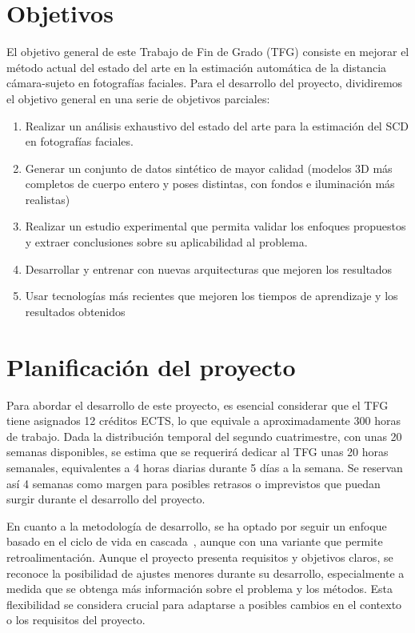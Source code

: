 \section{Objetivos}
El objetivo general de este Trabajo de Fin de Grado (TFG) consiste en mejorar el método actual del estado del arte en la estimación automática de la distancia cámara-sujeto en fotografías faciales. Para el desarrollo del proyecto, dividiremos el objetivo general en una serie de objetivos parciales:
\begin{enumerate}
    \item Realizar un análisis exhaustivo del estado del arte para la estimación del SCD en fotografías faciales.
    \item Generar un conjunto de datos sintético de mayor calidad (modelos 3D más completos de cuerpo entero y poses distintas, con fondos e iluminación más realistas)
    \item Realizar un estudio experimental que permita validar los enfoques propuestos y extraer conclusiones sobre su aplicabilidad al problema.
    \item Desarrollar y entrenar con nuevas arquitecturas que mejoren los resultados
    \item Usar tecnologías más recientes que mejoren los tiempos de aprendizaje y los resultados obtenidos
\end{enumerate}

\section{Planificación del proyecto}

Para abordar el desarrollo de este proyecto, es esencial considerar que el TFG tiene asignados 12 créditos ECTS, lo que equivale a aproximadamente 300 horas de trabajo. Dada la distribución temporal del segundo cuatrimestre, con unas 20 semanas disponibles, se estima que se requerirá dedicar al TFG unas 20 horas semanales, equivalentes a 4 horas diarias durante 5 días a la semana. Se reservan así 4 semanas como margen para posibles retrasos o imprevistos que puedan surgir durante el desarrollo del proyecto.

En cuanto a la metodología de desarrollo, se ha optado por seguir un enfoque basado en el ciclo de vida en cascada~\cite{38}, aunque con una variante que permite retroalimentación. Aunque el proyecto presenta requisitos y objetivos claros, se reconoce la posibilidad de ajustes menores durante su desarrollo, especialmente a medida que se obtenga más información sobre el problema y los métodos. Esta flexibilidad se considera crucial para adaptarse a posibles cambios en el contexto o los requisitos del proyecto.


